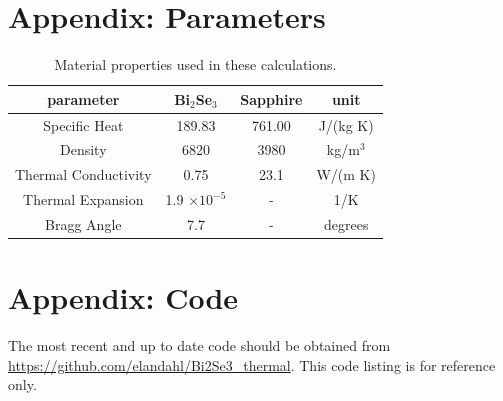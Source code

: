 \documentclass[letterpaper,11pt]{article}
\begin{document}
\newpage


\section*{Appendix: Parameters}

\begin{table}[h]
\begin{centering}
\begin{tabular}{c | c | c | c}
parameter  & Bi$_2$Se$_3$ & Sapphire & unit \\
\hline
Specific Heat & 189.83 & 761.00 & J/(kg K) \\
Density & 6820 & 3980 & kg/m$^3$ \\
Thermal Conductivity & 0.75 & 23.1 & W/(m K) \\
Thermal Expansion & 1.9 $\times 10^{-5}$ & - & 1/K \\
Bragg Angle & 7.7 & - & degrees \\
\end{tabular} 
\caption{Material properties used in these calculations. }
\label{table:sign_conventions}
\end{centering}
\end{table}

\pagebreak
\section*{Appendix: Code}

The most recent and up to date code should be obtained from \url{https://github.com/elandahl/Bi2Se3_thermal}.  This code listing is for reference only. 


\end{document}
